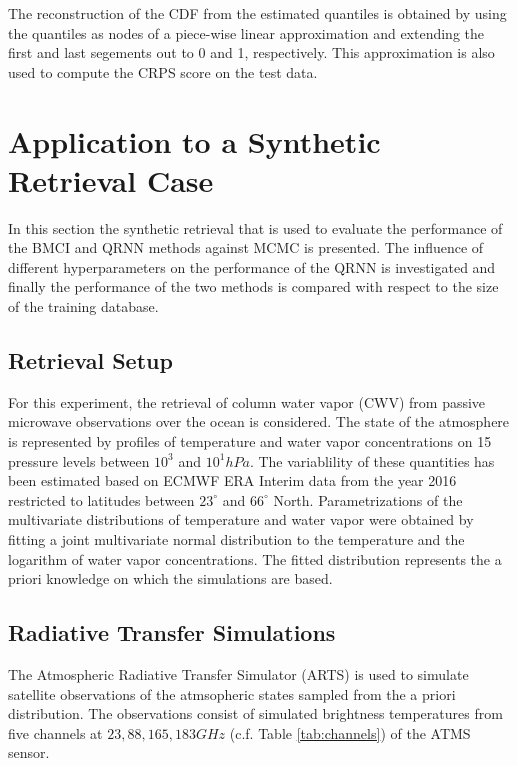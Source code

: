 \documentclass[journal abbreviation, manuscript]{copernicus}
\begin{document}
   The reconstruction of the CDF from the estimated quantiles is obtained
   by using the quantiles as nodes of a piece-wise linear approximation and
   extending the first and last segements out to 0 and 1, respectively.
   This approximation is also used to compute the CRPS score on the test
   data.



\section{Application to a Synthetic Retrieval Case}
\label{sec:synthetic}

  In this section the synthetic retrieval that is used to evaluate the
  performance of the BMCI and QRNN methods against MCMC is presented. The
  influence of different hyperparameters on the performance of the QRNN is
  investigated and finally the performance of the two methods is compared with
  respect to the size of the training database.

\subsection{Retrieval Setup}

   For this experiment, the retrieval of column water vapor (CWV) from passive
   microwave observations over the ocean is considered. The state of the
   atmosphere is represented by profiles of temperature and water vapor
   concentrations on 15 pressure levels between $10^3$ and $10^1\unit{hPa}$. The
   variablility of these quantities has been estimated based on ECMWF ERA
   Interim data \citep{era_interim} from the year 2016 restricted to latitudes
   between $23^\circ$ and $66^\circ$ North. Parametrizations of the multivariate
   distributions of temperature and water vapor were obtained by fitting a joint
   multivariate normal distribution to the temperature and the logarithm of
   water vapor concentrations. The fitted distribution represents the a priori
   knowledge on which the simulations are based.

\subsection{Radiative Transfer Simulations}

   The Atmospheric Radiative Transfer Simulator (ARTS) \citep{arts} is used to
   simulate satellite observations of the atmsopheric states sampled from the a
   priori distribution. The observations consist of simulated brightness
   temperatures from five channels at $23, 88, 165, 183 \unit{GHz}$
   (c.f. Table \ref{tab:channels}) of the ATMS sensor.
\end{document}
